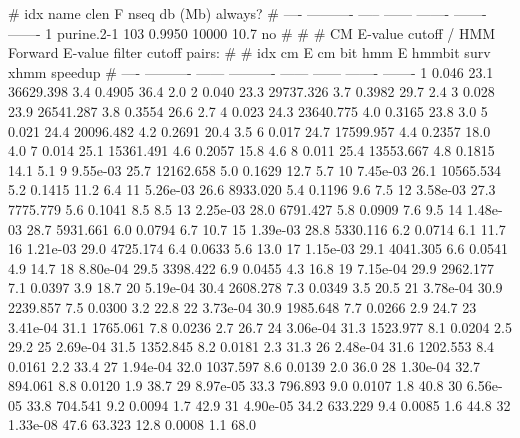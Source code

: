 
\begin{sreoutput}
#  idx  name         clen       F     nseq  db (Mb)  always?
# ----  ----------  -----  ------  -------  -------  -------
     1  purine.2-1    103  0.9950    10000     10.7       no
#
#
#       CM E-value cutoff / HMM Forward E-value filter cutoff pairs:
#
#       idx         cm E  cm bit       hmm E  hmmbit    surv     xhmm  speedup
#       ----  ----------  ------  ----------  ------  ------  -------  -------
           1       0.046    23.1   36629.398     3.4  0.4905     36.4      2.0
           2       0.040    23.3   29737.326     3.7  0.3982     29.7      2.4
           3       0.028    23.9   26541.287     3.8  0.3554     26.6      2.7
           4       0.023    24.3   23640.775     4.0  0.3165     23.8      3.0
           5       0.021    24.4   20096.482     4.2  0.2691     20.4      3.5
           6       0.017    24.7   17599.957     4.4  0.2357     18.0      4.0
           7       0.014    25.1   15361.491     4.6  0.2057     15.8      4.6
           8       0.011    25.4   13553.667     4.8  0.1815     14.1      5.1
           9    9.55e-03    25.7   12162.658     5.0  0.1629     12.7      5.7
          10    7.45e-03    26.1   10565.534     5.2  0.1415     11.2      6.4
          11    5.26e-03    26.6    8933.020     5.4  0.1196      9.6      7.5
          12    3.58e-03    27.3    7775.779     5.6  0.1041      8.5      8.5
          13    2.25e-03    28.0    6791.427     5.8  0.0909      7.6      9.5
          14    1.48e-03    28.7    5931.661     6.0  0.0794      6.7     10.7
          15    1.39e-03    28.8    5330.116     6.2  0.0714      6.1     11.7
          16    1.21e-03    29.0    4725.174     6.4  0.0633      5.6     13.0
          17    1.15e-03    29.1    4041.305     6.6  0.0541      4.9     14.7
          18    8.80e-04    29.5    3398.422     6.9  0.0455      4.3     16.8
          19    7.15e-04    29.9    2962.177     7.1  0.0397      3.9     18.7
          20    5.19e-04    30.4    2608.278     7.3  0.0349      3.5     20.5
          21    3.78e-04    30.9    2239.857     7.5  0.0300      3.2     22.8
          22    3.73e-04    30.9    1985.648     7.7  0.0266      2.9     24.7
          23    3.41e-04    31.1    1765.061     7.8  0.0236      2.7     26.7
          24    3.06e-04    31.3    1523.977     8.1  0.0204      2.5     29.2
          25    2.69e-04    31.5    1352.845     8.2  0.0181      2.3     31.3
          26    2.48e-04    31.6    1202.553     8.4  0.0161      2.2     33.4
          27    1.94e-04    32.0    1037.597     8.6  0.0139      2.0     36.0
          28    1.30e-04    32.7     894.061     8.8  0.0120      1.9     38.7
          29    8.97e-05    33.3     796.893     9.0  0.0107      1.8     40.8
          30    6.56e-05    33.8     704.541     9.2  0.0094      1.7     42.9
          31    4.90e-05    34.2     633.229     9.4  0.0085      1.6     44.8
          32    1.33e-08    47.6      63.323    12.8  0.0008      1.1     68.0
\end{sreoutput}

